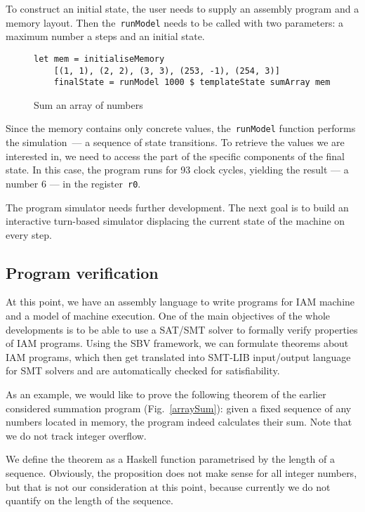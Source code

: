 To construct an initial state, the user needs to supply an assembly program and
a memory layout. Then the~\texttt{runModel} needs to be called
with two parameters: a maximum number a steps and an initial state.

\begin{figure}[H]
\begin{verbatim}
let mem = initialiseMemory
    [(1, 1), (2, 2), (3, 3), (253, -1), (254, 3)]
    finalState = runModel 1000 $ templateState sumArray mem
\end{verbatim}
\caption{Sum an array of numbers}
\end{figure}

Since the memory contains only concrete values, the~\texttt{runModel}
function performs the simulation~--- a sequence of state transitions. To retrieve
the values we are interested in, we need to access the part of the specific components
of the final state. In this case, the program runs for 93 clock cycles, yielding
the result --- a number 6 --- in the register~\texttt{r0}.

The program simulator needs further development. The next goal is to build an
interactive turn-based simulator displacing the current state of the machine
on every step.

\subsection{Program verification}

At this point, we have an assembly language to write programs for IAM machine
and a model of machine execution. One of the main objectives of the whole
developments is to be able to use a SAT/SMT solver to formally verify properties
of IAM programs. Using the SBV framework, we can formulate theorems about IAM programs,
which then get translated into SMT-LIB input/output language~\cite{smtlib} for
SMT solvers and are automatically checked for satisfiability.

As an example, we would like to prove the following theorem of the earlier considered
summation program (Fig.~\ref{arraySum}): given a fixed sequence of any numbers located in memory,
the program indeed calculates their sum. Note that we do not track integer overflow.

We define the theorem as a Haskell function parametrised by the length of a sequence.
Obviously, the proposition does not make sense for all integer numbers, but that is not our
consideration at this point, because currently we do not quantify on the length of the
sequence.

